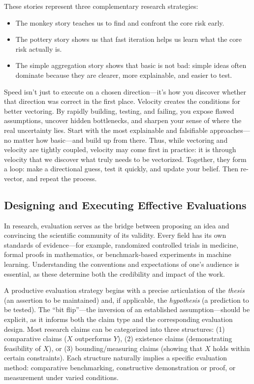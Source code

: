 These stories represent three complementary research strategies:
\begin{itemize}
    \item The monkey story teaches us to find and confront the core risk early.
    \item The pottery story shows us that fast iteration helps us learn what the core risk actually is.
    \item The simple aggregation story shows that basic is not bad: simple ideas often dominate because they are clearer, more explainable, and easier to test.
\end{itemize}

Speed isn't just to execute on a chosen direction---it's how you discover whether that direction was correct in the first place.
Velocity creates the conditions for better vectoring.
By rapidly building, testing, and failing, you expose flawed assumptions, uncover hidden bottlenecks, and sharpen your sense of where the real uncertainty lies.
Start with the most explainable and falsifiable approaches---no matter how basic---and build up from there.
Thus, while vectoring and velocity are tightly coupled, velocity may come first in practice: it is through velocity that we discover what truly needs to be vectorized.
Together, they form a loop: make a directional guess, test it quickly, and update your belief.
Then re-vector, and repeat the process.

\subsection{Designing and Executing Effective Evaluations}

In research, evaluation serves as the bridge between proposing an idea and convincing the scientific community of its validity.
Every field has its own standards of evidence---for example, randomized controlled trials in medicine, formal proofs in mathematics, or benchmark-based experiments in machine learning.
Understanding the conventions and expectations of one's audience is essential, as these determine both the credibility and impact of the work.

A productive evaluation strategy begins with a precise articulation of the \emph{thesis} (an assertion to be maintained) and, if applicable, the \emph{hypothesis} (a prediction to be tested).
The ``bit flip''---the inversion of an established assumption---should be explicit, as it informs both the claim type and the corresponding evaluation design.
Most research claims can be categorized into three structures: (1) comparative claims ($X$ outperforms $Y$), (2) existence claims (demonstrating feasibility of $X$), or (3) bounding/measuring claims (showing that $X$ holds within certain constraints).
Each structure naturally implies a specific evaluation method: comparative benchmarking, constructive demonstration or proof, or measurement under varied conditions.

